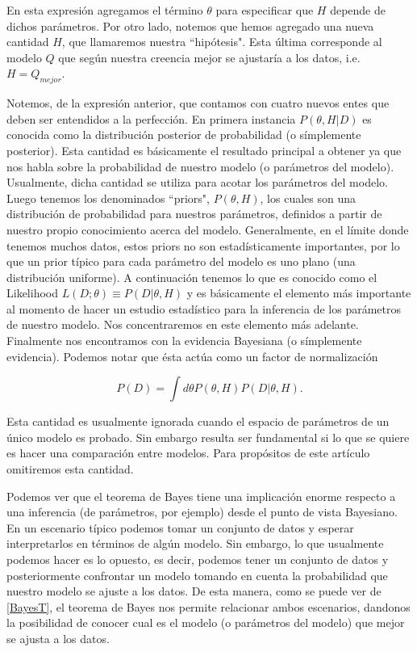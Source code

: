 \documentclass[10.5pt,prb,
               showpacs,            %
               preprintnumbers,     %
               aps,                 %
               prl,          	    %
               letterpaper,             %
               superscriptaddress,      %
               nofootinbib,         %
               tightenlines,        %
               floats,floatfix      %
               ,usenatbib]{revtex4-1}%
\begin{document}
\noindent
En esta expresi\'on agregamos el t\'ermino $\theta$ para especificar que $H$ depende de dichos par\'ametros. 
Por otro lado, notemos que hemos agregado una nueva cantidad $H$, que llamaremos nuestra ``hip\'otesis". 
Esta \'ultima corresponde al modelo $Q$ que seg\'un nuestra creencia mejor se ajustar\'ia a los datos, i.e. $H=Q_{mejor}$.

Notemos, de la expresi\'on anterior, que contamos con cuatro nuevos entes que deben ser entendidos 
a la perfecci\'on.  En primera instancia $P(\theta,H|D)$ 
es conocida como la distribuci\'on posterior de probabilidad (o s\'implemente posterior). Esta cantidad es 
b\'asicamente el resultado principal a obtener ya que nos habla sobre la probabilidad de nuestro modelo 
(o par\'ametros del modelo). 
Usualmente, dicha cantidad 
se utiliza para acotar los par\'ametros del modelo. Luego tenemos los denominados ``priors", $P(\theta,H)$, 
los cuales son una distribuci\'on de probabilidad para nuestros par\'ametros, definidos a partir de nuestro 
propio conocimiento acerca del modelo. Generalmente, en el l\'imite donde tenemos muchos datos, estos 
priors no son estad\'isticamente importantes, por lo que un prior t\'ipico para cada par\'ametro del 
modelo es uno plano (una distribuci\'on uniforme). A continuaci\'on tenemos lo que es conocido como el 
Likelihood $L(D;\theta)\equiv P(D|\theta,H)$ y es b\'asicamente el elemento m\'as importante al momento 
de hacer un estudio estad\'istico para la inferencia de los par\'ametros de nuestro modelo. Nos concentraremos 
en este elemento m\'as adelante. Finalmente nos encontramos con la evidencia Bayesiana (o s\'implemente evidencia). 
Podemos notar que \'esta act\'ua como un factor de normalizaci\'on

	\begin{equation}\label{BayesT2}
		P(D) = \int d\theta P(\theta,H)P(D|\theta,H).
	\end{equation}

\noindent
Esta cantidad es usualmente ignorada cuando el espacio de par\'ametros de un \'unico 
modelo es probado. Sin embargo resulta ser fundamental si lo que se quiere es hacer una 
comparaci\'on entre modelos. Para prop\'ositos de este art\'iculo omitiremos esta cantidad.

Podemos ver que el teorema de Bayes tiene una implicaci\'on enorme respecto a una inferencia 
(de par\'ametros, por ejemplo) desde el punto de vista Bayesiano. En un escenario t\'ipico podemos 
tomar un conjunto de datos y esperar interpretarlos en t\'erminos de alg\'un modelo. Sin embargo, 
lo que usualmente podemos hacer es lo opuesto, es decir, podemos tener un conjunto de datos y 
posteriormente confrontar un modelo tomando en cuenta la probabilidad que nuestro modelo se ajuste a los datos. 
De esta manera, como se puede ver de \eqref{BayesT}, el teorema de Bayes nos permite relacionar ambos 
escenarios, dandonos la posibilidad de conocer cual es el modelo (o par\'ametros del modelo) que mejor se ajusta a los datos.
\end{document}
